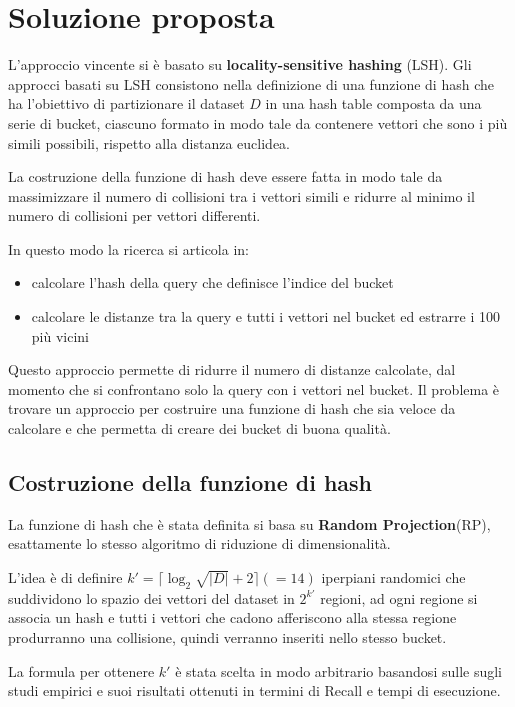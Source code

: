 \chapter{Soluzione proposta}
L'approccio vincente si è basato su \textbf{locality-sensitive hashing} (LSH).
Gli approcci basati su LSH consistono nella definizione di una funzione di hash 
che ha l'obiettivo di partizionare il dataset $D$ in una hash table composta 
da una serie di bucket, ciascuno 
formato in modo tale da contenere vettori che sono i più simili possibili, rispetto 
alla distanza euclidea. 

La costruzione della funzione di hash deve essere fatta in modo tale da 
massimizzare il numero di collisioni tra i vettori simili e ridurre al minimo 
il numero di collisioni per vettori differenti. 

In questo modo la ricerca si articola in:
\begin{itemize}
    \item calcolare l'hash della query che definisce l'indice del bucket
    \item calcolare le distanze tra la query e tutti i vettori nel bucket ed 
    estrarre i 100 più vicini
\end{itemize} 

Questo approccio permette di ridurre il numero di distanze calcolate, dal momento 
che si confrontano solo la query con i vettori nel bucket. Il problema è trovare 
un approccio per costruire una funzione di hash che sia veloce da calcolare e 
che permetta di creare dei bucket di buona qualità.

\section{Costruzione della funzione di hash}

La funzione di hash che è stata definita si basa su \textbf{Random Projection}(RP),
esattamente lo stesso algoritmo di riduzione di dimensionalità. 

L'idea è di definire $k' = \lceil \log_2{\sqrt{|D|}} + 2\rceil (= 14)$  iperpiani randomici che suddividono
lo spazio dei vettori del dataset in $2^{k'}$ regioni, ad ogni regione si associa 
un hash e tutti i vettori che cadono afferiscono alla stessa regione produrranno 
una collisione, quindi verranno inseriti nello stesso bucket.

\begin{nota}
    La formula per ottenere $k'$ è stata scelta in modo arbitrario basandosi sulle 
    sugli studi empirici e suoi risultati ottenuti in termini di Recall e tempi
    di esecuzione.
\end{nota}

